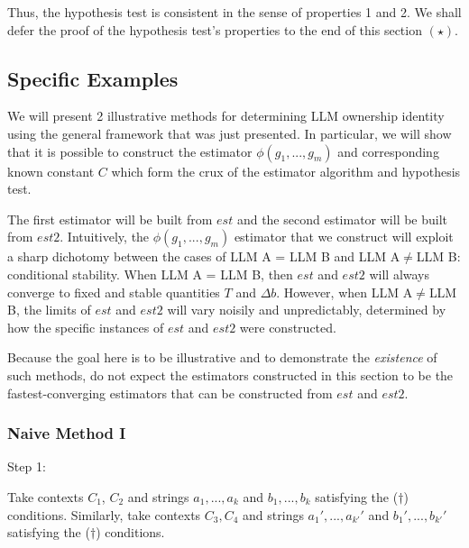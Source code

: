 \documentclass{article}
\begin{document}
Thus, the hypothesis test is consistent in the sense of properties 1 and 2. We shall defer the proof of the hypothesis test's properties to the end of this section $\displaystyle \left( \star \right)$.



\subsection{Specific Examples}

We will present 2 illustrative methods for determining LLM ownership identity using the general framework that was just presented. In particular, we will show that it is possible to construct the estimator $\displaystyle \phi \left( g_{1} ,...,g_{m}\right)$ and corresponding known constant $\displaystyle C$ which form the crux of the estimator algorithm and hypothesis test.



The first estimator will be built from $\displaystyle est$ and the second estimator will be built from $\displaystyle est2$. Intuitively, the $\displaystyle \phi \left( g_{1} ,...,g_{m}\right)$ estimator that we construct will exploit a sharp dichotomy between the cases of LLM A = LLM B and LLM A$\displaystyle \neq $LLM B: conditional stability. When LLM A = LLM B, then $\displaystyle est$ and $\displaystyle est2$ will always converge to fixed and stable quantities $\displaystyle T$ and $\displaystyle \Delta b$. However, when LLM A$\displaystyle \neq $LLM B, the limits of $\displaystyle est$ and $\displaystyle est2$ will vary noisily and unpredictably, determined by how the specific instances of $\displaystyle est$ and $\displaystyle est2$ were constructed.



Because the goal here is to be illustrative and to demonstrate the \textit{existence }of such methods, do not expect the estimators constructed in this section to be the fastest-converging estimators that can be constructed from $\displaystyle est$ and $\displaystyle est2$.



\subsubsection{Naive Method I}

Step 1:

Take contexts $\displaystyle C_{1}$, $\displaystyle C_{2}$ and strings $\displaystyle a_{1} ,...,a_{k}$ and $\displaystyle b_{1} ,...,b_{k}$ satisfying the ($\displaystyle \dagger $) conditions. Similarly, take contexts $\displaystyle C_{3} ,C_{4}$ and strings $\displaystyle a_{1} ',...,a_{k'} '$ and $\displaystyle b_{1} ',...,b_{k'} '$ satisfying the ($\displaystyle \dagger $) conditions.
\end{document}
